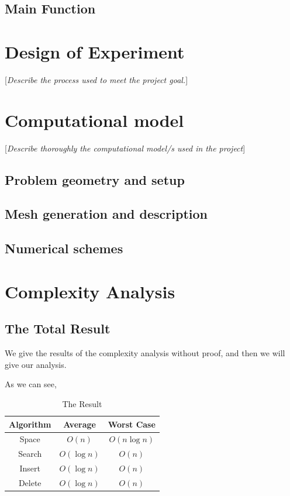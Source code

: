 \documentclass[10pt,english, openany]{book}
\begin{document}
\section{Main Function}



\chapter{Design of Experiment}\label{chapt:doe}
[\textit{Describe the process used to meet the project goal.}]

\chapter{Computational model}\label{chapt:model}
[\textit{Describe thoroughly the computational model/s used in the project}]
\section{Problem geometry and setup}
\section{Mesh generation and description}
\section{Numerical schemes}

\chapter{Complexity Analysis}
\section{The Total Result}
We give the results of the complexity analysis without proof, and then we will give our analysis.

As we can see, 
\begin{table}[h]
\centering
\begin{tabular}{ccc}
\textbf{Algorithm} & \textbf{Average} & \textbf{Worst Case} \\
\hline
Space & $O(n)$ & $O(n\log n)$ \\
\hline
Search & $O(\log n)$ & $O(n)$\\
\hline
Insert & $O(\log n)$ & $O(n)$ \\ 
\hline
Delete & $O(\log n)$ & $O(n)$ \\
\hline
\end{tabular}
\caption{The Result}
\end{table}
\end{document}
